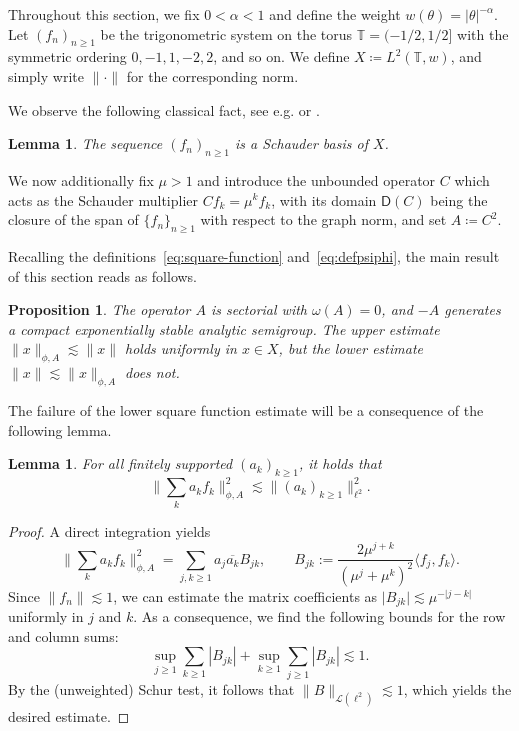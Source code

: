 \documentclass[11pt]{amsart}
\newtheorem{proposition}[theorem]{Proposition}
\newtheorem{lemma}[theorem]{Lemma}
\theoremstyle{definition}
\theoremstyle{remark}
\numberwithin{equation}{section}
\newcommand{\1}{\mathbf 1}
\newcommand{\cD}{\mathsf D}
\newcommand{\norm}[1]{\lVert #1\rVert}
\newcommand{\abs}[1]{\lvert #1\rvert}
\begin{document}
Throughout this section, we fix $0 < \alpha < 1$ and define the weight $w(\theta) = \abs{\theta}^{-\alpha}$.
    Let $(f_n)_{n \geq 1}$ be the trigonometric system on the torus $\mathbb{T} = (-1/2, 1/2]$ with the symmetric ordering $0, -1, 1, -2, 2$, and so on.
    We define $X \coloneq L^2(\mathbb{T},w)$, and simply write $\norm{\cdot}$ for the corresponding norm.

We observe the following classical fact, see e.g. \cite[Example 10.2.32]{HNVW2017} or \cite[Proposition~2.3]{Nielsen2009}.
\begin{lemma}
    The sequence $(f_n)_{n \geq 1}$ is a Schauder basis of $X$.
\end{lemma}
We now additionally fix $\mu > 1$ and introduce the unbounded operator $C$ which acts as the 
Schauder multiplier $C f_k = \mu^k f_k$, with its domain $\cD(C)$ being the closure of the span of $\{f_n\}_{n \geq 1}$ with respect to the graph norm, and set $A \coloneq C^2$.

Recalling the definitions~\eqref{eq:square-function} and~\eqref{eq:defpsiphi}, the main result of this section reads as follows.
\begin{proposition}
    \label{prop:sqrfuncexample}
    The operator $A$ is sectorial with $\omega(A) = 0$, and $-A$ generates a compact exponentially stable analytic semigroup.
   The upper estimate $\norm{x}_{\phi,A} \lesssim \norm{x}$ holds uniformly in $x\in X$, but the lower estimate $\norm{x} \lesssim \norm{x}_{\phi,A}$  does not.
\end{proposition}

The failure of the lower square function estimate will be a consequence of the following lemma.
\begin{lemma}
    For all finitely supported $(a_k)_{k \geq 1}$, it holds that
    \begin{equation}
    \norm{\sum_k a_k f_k}_{\phi,A}^2 
    \lesssim \norm{(a_k)_{k \geq 1}}_{\ell^2}^2 \label{eq:QC-upper-coefficient-estimate}.
\end{equation}
\end{lemma}
\begin{proof}
A direct integration yields
\[
  \norm{\sum_k a_kf_k}_{\phi,A}^2
 =
 \sum_{j,k\geq 1}a_j\overline{a_k}B_{jk},
 \qquad
 B_{jk}
 :=
 \frac{2\mu^{j+k}}{(\mu^j+\mu^k)^2}\langle f_j,f_k\rangle.
\]
Since $\norm{f_n} \lesssim 1$, we can estimate the matrix coefficients as $\abs{B_{jk}} \lesssim \mu^{-\abs{j - k}}$ uniformly in $j$ and $k$. As a consequence, we find the following bounds for the row and column sums:
\begin{equation}
 \sup_{j\geq 1}\sum_{k\geq 1}|B_{jk}| + \sup_{k\geq 1}\sum_{j\geq 1}|B_{jk}| \lesssim 1.
\end{equation}
By the (unweighted) Schur test, it follows that $\|B\|_{\mathcal L(\ell^2)} \lesssim 1$, which yields the desired estimate.
\end{proof}
\end{document}
